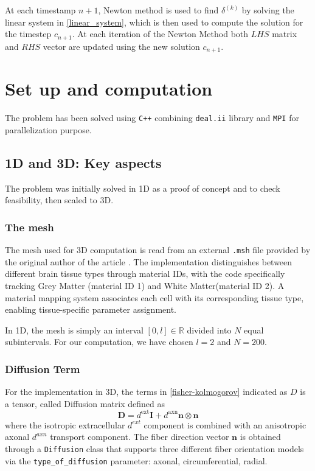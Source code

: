 \documentclass[12pt, a4paper, twoside, openright]{report}
\begin{document}
At each timestamp $n+1$, Newton method is used to find $\delta^{(k)}$ by solving the linear system in \autoref{linear_system}, which is then used to compute the solution for the timestep $c_{n+1}$. At each iteration of the Newton Method both $LHS$ matrix and $RHS$ vector are updated using the new solution $c_{n+1}$.


 \chapter{Set up and computation}
 The problem has been solved using \verb|C++| combining \verb|deal.ii| library and \verb|MPI| for parallelization purpose.
 
 \section{1D and 3D: Key aspects}
 The problem was initially solved in 1D as a proof of concept and to check feasibility, then scaled to 3D.
 \subsection{The mesh}
 The mesh used for 3D computation is read from an external \verb|.msh| file provided by the original author of the article \cite{WEICKENMEIER2019264}.
 The implementation distinguishes between different brain tissue types through material IDs, with the code specifically tracking Grey Matter (material ID 1) and White Matter(material ID 2). A material mapping system associates each cell with its corresponding tissue type, enabling tissue-specific parameter assignment.

In 1D, the mesh is simply an interval $[0, l] \in \mathbb{R}$ divided into $N$ equal subintervals. For our computation, we have chosen $l=2$ and $N=200$.
\subsection{Diffusion Term}
 For the implementation in 3D, the terms in \autoref{fisher-kolmogorov} indicated as $D$ is a tensor, called Diffusion matrix defined as
 $$\mathbf{D} = d^{\text{ext}} \mathbf{I} + d^{\text{axn}} \mathbf{n} \otimes \mathbf{n}$$ where the isotropic extracellular $d^{ext}$ component is combined with an anisotropic axonal $d^{axn}$ transport component. The fiber direction vector $\mathbf{n}$ is obtained through a \verb|Diffusion| class that supports three different fiber orientation models via the \verb|type_of_diffusion| parameter: axonal, circumferential, radial. 
\end{document}
